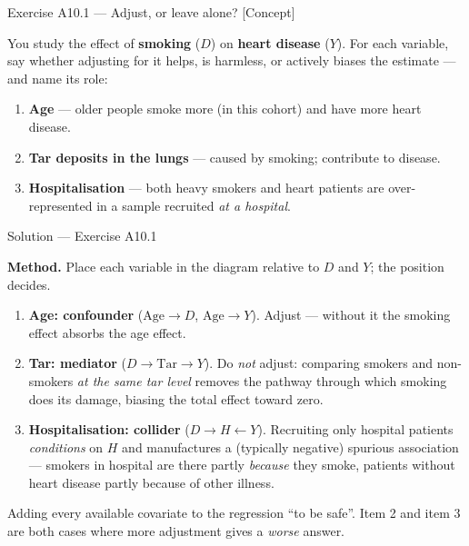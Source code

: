 \documentclass[aspectratio=169,11pt]{beamer}
\begin{document}
\begin{frame}{Exercise A10.1 --- Adjust, or leave alone? [Concept]}
  \begin{exercise}
    You study the effect of \textbf{smoking} ($D$) on \textbf{heart disease} ($Y$).
    For each variable, say whether adjusting for it helps, is harmless, or actively
    biases the estimate --- and name its role:
    \begin{enumerate}
      \item \textbf{Age} --- older people smoke more (in this cohort) and have more
            heart disease.
      \item \textbf{Tar deposits in the lungs} --- caused by smoking; contribute to
            disease.
      \item \textbf{Hospitalisation} --- both heavy smokers and heart patients are
            over-represented in a sample recruited \emph{at a hospital}.
    \end{enumerate}
  \end{exercise}
\end{frame}

\begin{frame}{Solution --- Exercise A10.1}
  \begin{solutionbox}
    \footnotesize
    \textbf{Method.} Place each variable in the diagram relative to $D$ and $Y$;
    the position decides.
    \begin{enumerate}
      \item \textbf{Age: confounder} ($\text{Age} \to D$, $\text{Age} \to Y$).
            Adjust --- without it the smoking effect absorbs the age effect.
      \item \textbf{Tar: mediator} ($D \to \text{Tar} \to Y$). Do \emph{not} adjust:
            comparing smokers and non-smokers \emph{at the same tar level} removes
            the pathway through which smoking does its damage, biasing the total
            effect toward zero.
      \item \textbf{Hospitalisation: collider} ($D \to H \leftarrow Y$). Recruiting
            only hospital patients \emph{conditions} on $H$ and manufactures a
            (typically negative) spurious association --- smokers in hospital are
            there partly \emph{because} they smoke, patients without heart disease
            partly because of other illness.
    \end{enumerate}
  \end{solutionbox}
  \begin{mistake}
    Adding every available covariate to the regression ``to be safe''. Item 2 and
    item 3 are both cases where more adjustment gives a \emph{worse} answer.
  \end{mistake}
\end{frame}
\end{document}
